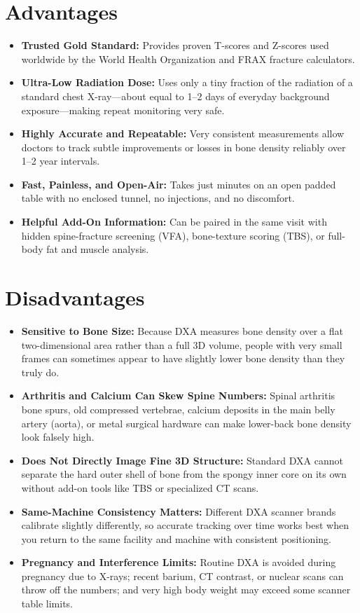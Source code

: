 \section{Advantages}
\begin{itemize}
\item \textbf{Trusted Gold Standard:} Provides proven T-scores and Z-scores used worldwide by the World Health Organization and FRAX fracture calculators.
\item \textbf{Ultra-Low Radiation Dose:} Uses only a tiny fraction of the radiation of a standard chest X-ray---about equal to 1--2 days of everyday background exposure---making repeat monitoring very safe.
\item \textbf{Highly Accurate and Repeatable:} Very consistent measurements allow doctors to track subtle improvements or losses in bone density reliably over 1--2 year intervals.
\item \textbf{Fast, Painless, and Open-Air:} Takes just minutes on an open padded table with no enclosed tunnel, no injections, and no discomfort.
\item \textbf{Helpful Add-On Information:} Can be paired in the same visit with hidden spine-fracture screening (VFA), bone-texture scoring (TBS), or full-body fat and muscle analysis.
\end{itemize}

\section{Disadvantages}
\begin{itemize}
\item \textbf{Sensitive to Bone Size:} Because DXA measures bone density over a flat two-dimensional area rather than a full 3D volume, people with very small frames can sometimes appear to have slightly lower bone density than they truly do.
\item \textbf{Arthritis and Calcium Can Skew Spine Numbers:} Spinal arthritis bone spurs, old compressed vertebrae, calcium deposits in the main belly artery (aorta), or metal surgical hardware can make lower-back bone density look falsely high.
\item \textbf{Does Not Directly Image Fine 3D Structure:} Standard DXA cannot separate the hard outer shell of bone from the spongy inner core on its own without add-on tools like TBS or specialized CT scans.
\item \textbf{Same-Machine Consistency Matters:} Different DXA scanner brands calibrate slightly differently, so accurate tracking over time works best when you return to the same facility and machine with consistent positioning.
\item \textbf{Pregnancy and Interference Limits:} Routine DXA is avoided during pregnancy due to X-rays; recent barium, CT contrast, or nuclear scans can throw off the numbers; and very high body weight may exceed some scanner table limits.
\end{itemize}

